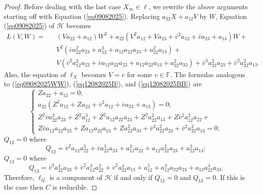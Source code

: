 \documentclass[sn-mathphys-num]{sn-jnl}%
\begin{document}
\begin{proof}
Before dealing with the last case $X_\infty\in \ell$, we rewrite the above arguments starting off with Equation (\ref{eq09082025}).
Replacing $a_{22}X+a_{12}V$ by $W$, Equation (\ref{eq09082025}) of $\mathcal{H}$ becomes
\begin{equation*}
\label{eq09082025w1}
\begin{array}{llll}L(V,W)=&&(Va_{22}+a_{12})W^2+a_{22}(V^2a_{12}+Va_{23}+\bar{v}^2a_{12}+\bar{v}a_{23}+a_{13})W+\\
&&V^2(\bar{v}a_{22}^2a_{23} + a_{12}^3 + a_{12}a_{22}a_{23} + a_{22}^2a_{13}) +  \\ && V(\bar{v}^2a_{12}^2a_{22} +\bar{v}a_{12}a_{22}a_{23} +a_{12}a_{22}a_{13} + a_{22}^2a_{33}) + \bar{v}^3a_{22}^2a_{23} + \bar{v}^2a_{22}^2a_{13}.
\end{array}
\end{equation*}
Also, the equation of $\ell_X$ becomes $V=v$ for some $v\in \mathbb{F}$. 
The formulas analogous to (\ref{eq09082025WW}), (\ref{eq12082025B}), and (\ref{eq12082025BB}) are
\begin{equation*}
\label{eq09082025WR}
\begin{cases}
Za_{22}+a_{12}=0;\\
a_{22}(Z^2a_{12}+Za_{23}+\bar{v}^2a_{12}+\bar{v}a_{23}+a_{13})=0;\\
Z^2\bar{v}a_{22}^2a_{23} + Z^2a_{12}^3 + Z^2a_{12}a_{22}a_{23} + Z^2a_{22}^2a_{13} + Z\bar{v}^2a_{12}^2a_{22} + \\
Z\bar{v}a_{12}a_{22}a_{23} +Za_{12}a_{22}a_{13} + Za_{22}^2a_{33} + \bar{v}^3a_{22}^2a_{23} + \bar{v}^2a_{22}^2a_{13}=0;
\end{cases}
\end{equation*}
$Q_{12}=0$ where
\begin{equation*}
\label{eq12082025BQ}
Q_{12}=\bar{v}^2a_{12}a_{22}^3 + \bar{v}a_{22}^3a_{23}+ a_{12}^3a_{22} + a_{12}a_{22}^2a_{23} + a_{22}^3a_{13};
\end{equation*}
$Q_{13}=0$ where
\begin{equation*}
\label{eq12082025BBQ}
Q_{13}=\bar{v}^3a_{22}^4a_{23}+ \bar{v}^2a_{12}^3a_{22}^2 + \bar{v}^2a_{22}^4a_{13}+ a_{12}^5 + a_{12}^3a_{22}a_{23} + a_{12}a_{22}^3a_{33}.
\end{equation*}
Therefore, $\ell_Q$ is a component of $\mathcal{H}$ if and only if $Q_{12}=0$ and $Q_{13}=0$. If this is the case then $C$ is reducible.


\end{proof}
\end{document}
